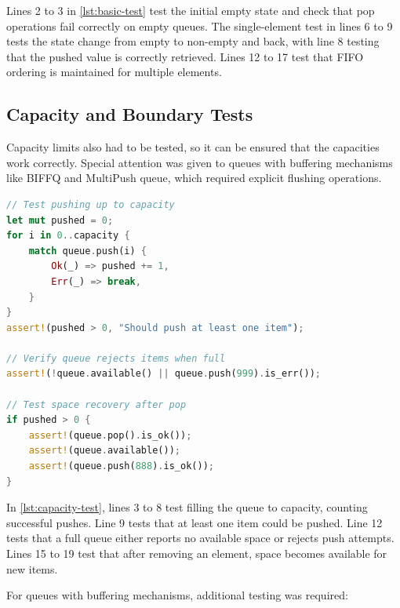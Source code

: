 Lines 2 to 3 in \cref{lst:basic-test} test the initial empty state and check that pop operations fail correctly on empty queues. The single-element test in lines 6 to 9 tests the state change from empty to non-empty and back, with line 8 testing that the pushed value is correctly retrieved. Lines 12 to 17 test that FIFO ordering is maintained for multiple elements.

\subsection{Capacity and Boundary Tests}
Capacity limits also had to be tested, so it can be ensured that the capacities work correctly. Special attention was given to queues with buffering mechanisms like \ac{BIFFQ} and MultiPush queue, which required explicit flushing operations.

\begin{lstlisting}[language=Rust, style=boxed, caption={Capacity limit test pattern}, label={lst:capacity-test}]
// Test pushing up to capacity
let mut pushed = 0;
for i in 0..capacity {
    match queue.push(i) {
        Ok(_) => pushed += 1,
        Err(_) => break,
    }
}
assert!(pushed > 0, "Should push at least one item");

// Verify queue rejects items when full
assert!(!queue.available() || queue.push(999).is_err());

// Test space recovery after pop
if pushed > 0 {
    assert!(queue.pop().is_ok());
    assert!(queue.available());
    assert!(queue.push(888).is_ok());
}
\end{lstlisting}

In \cref{lst:capacity-test}, lines 3 to 8 test filling the queue to capacity, counting successful pushes. Line 9 tests that at least one item could be pushed. Line 12 tests that a full queue either reports no available space or rejects push attempts. Lines 15 to 19 test that after removing an element, space becomes available for new items.

For queues with buffering mechanisms, additional testing was required:

